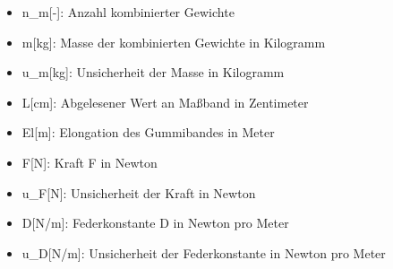 \documentclass[
  9pt,
]{article}
\providecommand{\tightlist}{%
  \setlength{\itemsep}{0pt}\setlength{\parskip}{0pt}}
\begin{document}
\begin{itemize}
\tightlist
\item
  n\_m{[}-{]}: Anzahl kombinierter Gewichte
\item
  m{[}kg{]}: Masse der kombinierten Gewichte in Kilogramm
\item
  u\_m{[}kg{]}: Unsicherheit der Masse in Kilogramm
\item
  L{[}cm{]}: Abgelesener Wert an Maßband in Zentimeter
\item
  El{[}m{]}: Elongation des Gummibandes in Meter
\item
  F{[}N{]}: Kraft F in Newton
\item
  u\_F{[}N{]}: Unsicherheit der Kraft in Newton
\item
  D{[}N/m{]}: Federkonstante D in Newton pro Meter
\item
  u\_D{[}N/m{]}: Unsicherheit der Federkonstante in Newton pro Meter
\end{itemize}
\end{document}
